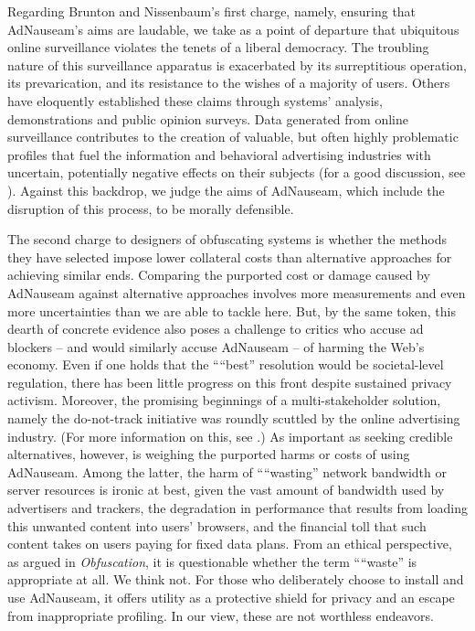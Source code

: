 \documentclass[conference]{IEEEtran}
\begin{document}
Regarding Brunton and Nissenbaum's first charge, namely, ensuring that AdNauseam's aims are laudable, we take as a point of departure that ubiquitous online surveillance violates the tenets of a liberal democracy. The troubling nature of this surveillance apparatus is exacerbated by its surreptitious operation, its prevarication, and its resistance to the wishes of a majority of users. Others have eloquently established these claims through systems' analysis, demonstrations and public opinion surveys. \cite{Turow, Goldfarb, Malheiros, Tsai, Tucker} Data generated from online surveillance contributes to the creation of valuable, but often highly problematic profiles that fuel the information and behavioral advertising industries with uncertain, potentially negative effects on their subjects (for a good discussion, see \cite{Pasquale}). Against this backdrop, we judge the aims of AdNauseam, which include the disruption of this process, to be morally defensible.

The second charge to designers of obfuscating systems is whether the methods they have selected impose lower collateral costs than alternative approaches for achieving similar ends. Comparing the purported cost or damage caused by AdNauseam against alternative approaches involves more measurements and even more uncertainties than we are able to tackle here. But, by the same token, this dearth of concrete evidence also poses a challenge to critics who accuse ad blockers -- and would similarly accuse AdNauseam -- of harming the Web's economy. Even if one holds that the ““best” resolution would be societal-level regulation, there has been little progress on this front despite sustained privacy activism. Moreover, the promising beginnings of a multi-stakeholder solution, namely the do-not-track initiative was roundly scuttled by the online advertising industry. (For more information on this, see \cite{Brunton}.)
As important as seeking credible alternatives, however, is weighing the purported harms or costs of using AdNauseam. Among the latter, the harm of ““wasting” network bandwidth or server resources is ironic at best, given the vast amount of bandwidth used by advertisers and trackers, the degradation in performance that results from loading this unwanted content into users' browsers, and the financial toll that such content takes on users paying for fixed data plans. From an ethical perspective, as argued in  \emph{Obfuscation}, it is questionable whether the term ““waste” is appropriate at all. We think not. For those who deliberately choose to install and use AdNauseam, it offers utility as a protective shield for privacy and an escape from inappropriate profiling. In our view, these are not worthless endeavors.
\end{document}
